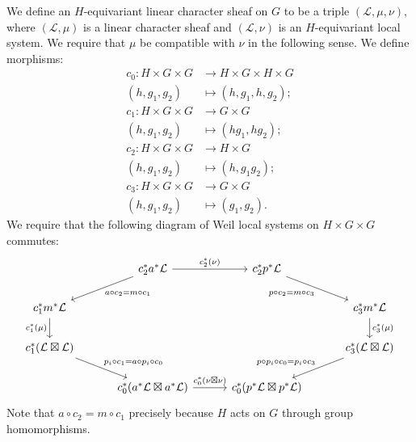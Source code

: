 \documentclass[10pt]{amsart}
\theoremstyle{plain}
\theoremstyle{definition}
\newcommand{\cs}[1]{{\mathcal{#1}}}
\begin{document}
We define an $H$-equivariant linear character sheaf on $G$ to be a triple $(\cs{L},\mu, \nu)$, where $(\cs{L},\mu)$ is a linear character sheaf and $(\cs{L},\nu)$ is an $H$-equivariant local system.  We require that $\mu$ be compatible with $\nu$ in the following sense.
We define morphisms:
\begin{align*}
c_0 : H\times G \times G &\to H\times G \times H \times G \\
(h,g_1,g_2) &\mapsto (h,g_1,h,g_2); \\
c_1 : H \times G\times G &\to G\times G \\
(h, g_1, g_2) &\mapsto (hg_1,hg_2); \\
c_2 : H \times G\times G &\to H\times G \\
(h,g_1,g_2) &\mapsto (h, g_1g_2); \\
c_3 : H \times G\times G &\to G\times G \\
(h, g_1, g_2) &\mapsto (g_1, g_2).
\end{align*}
We require that the following diagram of Weil local systems on $H \times G\times G$ commutes: %
\begin{equation}\label{ECS1}
\begin{tikzcd}[column sep=30]
\ & \arrow{dl}{a\circ c_2 = m\circ c_1}  c_2^* a^* \cs{L} \arrow{r}{c_2^*(\nu)} & c_2^* p^* \cs{L} \arrow{dr}[swap]{p\circ c_2 = m\circ c_3}  &  \\
\arrow{d}[swap]{c_1^*(\mu)} c_1^* m^* \cs{L} &&& c_3^* m^*\cs{L} \arrow{d}{c_3^*(\mu)} \\
c_1^*(\cs{L}\boxtimes \cs{L}) \arrow{dr}{p_i\circ c_1 = a\circ p_i\circ c_0} &&& \arrow{dl}[swap]{p\circ p_i\circ c_0 = p_i \circ c_3} c_3^*(\cs{L}\boxtimes \cs{L}) \\
 & c_0^*(a^*\cs{L}\boxtimes a^*\cs{L}) \arrow{r}{c_0^*(\nu\boxtimes \nu)} & c_0^*(p^*\cs{L} \boxtimes p^*\cs{L}) & 
\end{tikzcd}
\end{equation}
Note that $a\circ c_2 = m\circ c_1$ precisely because $H$ acts on $G$ through group homomorphisms.


\end{document}
